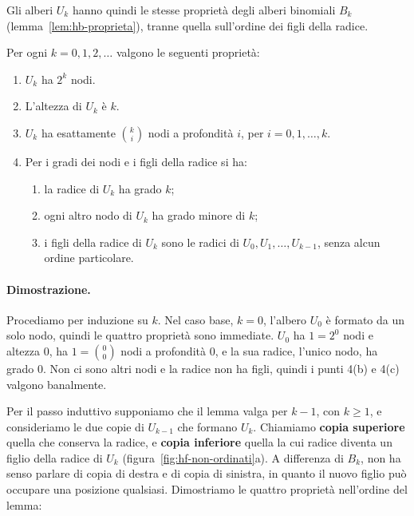 Gli alberi $U_k$ hanno quindi le stesse proprietà degli alberi binomiali $B_k$ (lemma~\ref{lem:hb-proprieta}), tranne quella sull'ordine dei figli della radice.

\begin{lemma}\label{lem:hf-non-ordinati}
Per ogni $k = 0, 1, 2, \ldots$ valgono le seguenti proprietà:
\begin{enumerate}
    \item $U_k$ ha $2^k$ nodi.
    \item L'altezza di $U_k$ è $k$.
    \item $U_k$ ha esattamente $\binom{k}{i}$ nodi a profondità $i$, per $i = 0, 1, \ldots, k$.
    \item Per i gradi dei nodi e i figli della radice si ha:
    \begin{enumerate}[label=(\alph*)]
        \item la radice di $U_k$ ha grado $k$;
        \item ogni altro nodo di $U_k$ ha grado minore di $k$;
        \item i figli della radice di $U_k$ sono le radici di $U_0, U_1, \ldots, U_{k-1}$, senza alcun ordine particolare.
    \end{enumerate}
\end{enumerate}
\end{lemma}

\paragraph{Dimostrazione.}
Procediamo per induzione su $k$. Nel caso base, $k = 0$, l'albero $U_0$ è formato da un solo nodo, quindi le quattro proprietà sono immediate. $U_0$ ha $1 = 2^0$ nodi e altezza $0$, ha $1 = \binom{0}{0}$ nodi a profondità $0$, e la sua radice, l'unico nodo, ha grado $0$. Non ci sono altri nodi e la radice non ha figli, quindi i punti 4(b) e 4(c) valgono banalmente.

Per il passo induttivo supponiamo che il lemma valga per $k-1$, con $k \ge 1$, e consideriamo le due copie di $U_{k-1}$ che formano $U_k$. Chiamiamo \textbf{copia superiore} quella che conserva la radice, e \textbf{copia inferiore} quella la cui radice diventa un figlio della radice di $U_k$ (figura~\ref{fig:hf-non-ordinati}a). A differenza di $B_k$, non ha senso parlare di copia di destra e di copia di sinistra, in quanto il nuovo figlio può occupare una posizione qualsiasi. Dimostriamo le quattro proprietà nell'ordine del lemma:

